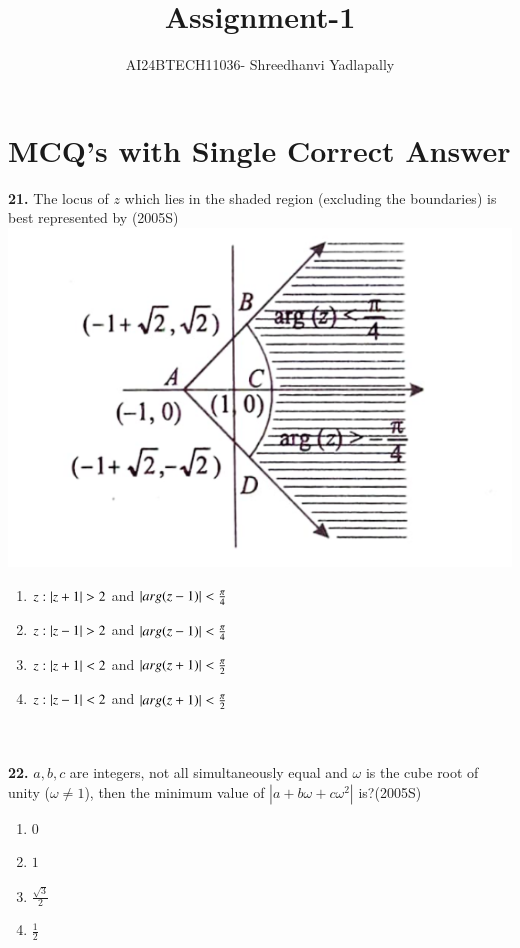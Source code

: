 \documentclass[journal,12pt,twocolumn]{IEEEtran}
\theoremstyle{remark}
\begin{document}

\vspace{3cm}

\title{Assignment-1}
\author{AI24BTECH11036- Shreedhanvi Yadlapally}
\maketitle
\newpage
\bigskip
\section{MCQ's with Single Correct Answer}
\textbf{21.} The locus of $z$ which lies in the shaded region (excluding the boundaries) is best represented by \hfill{(2005S)}\\
\includegraphics[scale=0.2]{Screenshot_20240807-085214}
\begin{enumerate}[label=(\alph*)]
\item $z:\left\vert z+1\right\vert>2$ and  $\left\vert arg(z-1)\right\vert<\frac{\pi}{4}$
\item $z:\left\vert z-1\right\vert>2$ and $\left\vert arg(z-1)\right\vert<\frac{\pi}{4}$
\item $z:\left\vert z+1\right\vert<2$ and $\left\vert arg(z+1)\right\vert<\frac{\pi}{2}$
\item $z:\left\vert z-1\right\vert<2$ and $\left\vert arg(z+1)\right\vert<\frac{\pi}{2}$
\end{enumerate}\\\\
\textbf{22.} $a,b,c$ are integers, not all simultaneously equal and $\omega$ is the cube root of unity ($\omega \neq 1$), then the minimum value of $|a+b\omega+c\omega^{2}|$ is?\hfill{(2005S)}
\begin{enumerate}[label=(\alph*)]
	\item $0$
	\item $1$
	\item $\frac{\sqrt{3}}{2}$
	\item $\frac{1}{2}$
\end{enumerate}
\end{document}
